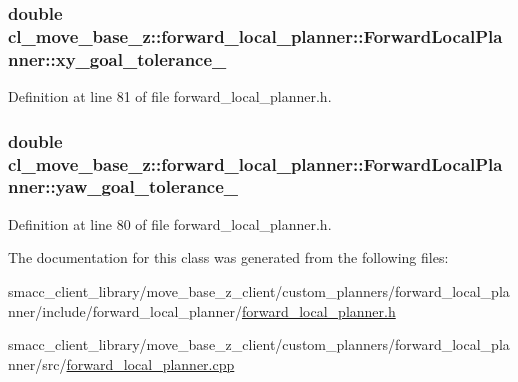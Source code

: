 \subsubsection[{\texorpdfstring{xy\+\_\+goal\+\_\+tolerance\+\_\+}{xy_goal_tolerance_}}]{\setlength{\rightskip}{0pt plus 5cm}double cl\+\_\+move\+\_\+base\+\_\+z\+::forward\+\_\+local\+\_\+planner\+::\+Forward\+Local\+Planner\+::xy\+\_\+goal\+\_\+tolerance\+\_\+\hspace{0.3cm}{\ttfamily [private]}}\hypertarget{classcl__move__base__z_1_1forward__local__planner_1_1ForwardLocalPlanner_acd2ed91ee166f03faeeb9d6a4b91084b}{}\label{classcl__move__base__z_1_1forward__local__planner_1_1ForwardLocalPlanner_acd2ed91ee166f03faeeb9d6a4b91084b}


Definition at line 81 of file forward\+\_\+local\+\_\+planner.\+h.

\subsubsection[{\texorpdfstring{yaw\+\_\+goal\+\_\+tolerance\+\_\+}{yaw_goal_tolerance_}}]{\setlength{\rightskip}{0pt plus 5cm}double cl\+\_\+move\+\_\+base\+\_\+z\+::forward\+\_\+local\+\_\+planner\+::\+Forward\+Local\+Planner\+::yaw\+\_\+goal\+\_\+tolerance\+\_\+\hspace{0.3cm}{\ttfamily [private]}}\hypertarget{classcl__move__base__z_1_1forward__local__planner_1_1ForwardLocalPlanner_a7ea1ca266850c7b847a2355f489e6041}{}\label{classcl__move__base__z_1_1forward__local__planner_1_1ForwardLocalPlanner_a7ea1ca266850c7b847a2355f489e6041}


Definition at line 80 of file forward\+\_\+local\+\_\+planner.\+h.



The documentation for this class was generated from the following files\+:\begin{DoxyCompactItemize}
\item 
smacc\+\_\+client\+\_\+library/move\+\_\+base\+\_\+z\+\_\+client/custom\+\_\+planners/forward\+\_\+local\+\_\+planner/include/forward\+\_\+local\+\_\+planner/\hyperlink{forward__local__planner_2include_2forward__local__planner_2forward__local__planner_8h}{forward\+\_\+local\+\_\+planner.\+h}\item 
smacc\+\_\+client\+\_\+library/move\+\_\+base\+\_\+z\+\_\+client/custom\+\_\+planners/forward\+\_\+local\+\_\+planner/src/\hyperlink{forward__local__planner_8cpp}{forward\+\_\+local\+\_\+planner.\+cpp}\end{DoxyCompactItemize}
